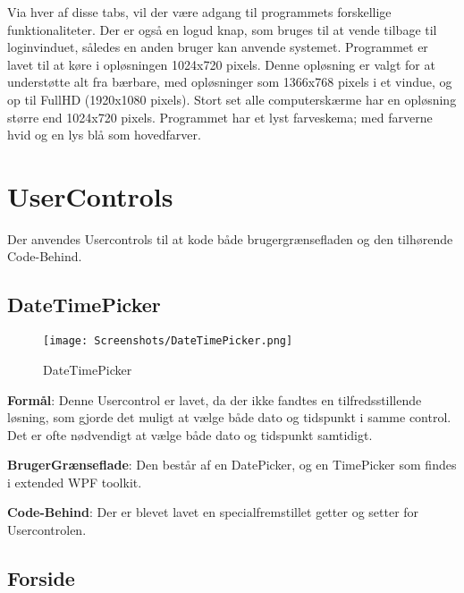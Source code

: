 Via hver af disse tabs, vil der være adgang til programmets forskellige funktionaliteter.
Der er også en logud knap, som bruges til at vende tilbage til loginvinduet, således en anden bruger kan anvende systemet.
Programmet er lavet til at køre i opløsningen 1024x720 pixels.
Denne opløsning er valgt for at understøtte alt fra bærbare, med opløsninger som 1366x768 pixels i et vindue, og op til FullHD (1920x1080 pixels). 
Stort set alle computerskærme har en opløsning større end 1024x720 pixels\citep{resolutions}. 
Programmet har et lyst farveskema; med farverne hvid og en lys blå som hovedfarver.

\section{UserControls}
Der anvendes Usercontrols til at kode både brugergrænsefladen og den tilhørende Code-Behind.

\subsection{DateTimePicker}\label{subsec:DateTimePicker}

\begin{wrapfigure}{r}{0.5\textwidth}
    \label{img:DateTimePicker}
    \vspace{-20pt}
    \begin{center}
        \texttt{[image: Screenshots/DateTimePicker.png]}
    \end{center}
    \vspace{-15pt}
    \caption{DateTimePicker}
    \vspace{-30pt}
\end{wrapfigure}

\textbf{Formål}: 
Denne Usercontrol er lavet, da der ikke fandtes en tilfredsstillende løsning, som gjorde det muligt at vælge både dato og tidspunkt i samme control. 
Det er ofte nødvendigt at vælge både dato og tidspunkt samtidigt. 

\textbf{BrugerGrænseflade}: 
Den består af en DatePicker, og en TimePicker som findes i extended WPF toolkit.

\textbf{Code-Behind}: 
Der er blevet lavet en specialfremstillet getter og setter for Usercontrolen. 


\subsection{Forside}


